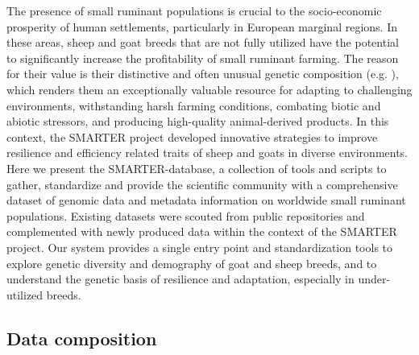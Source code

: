\documentclass[a4paper,num-refs,gigabyte]{oup-contemporary}
\begin{document}
The presence of small ruminant populations is crucial to the socio-economic prosperity of human settlements, particularly in European marginal regions. In these areas, sheep and goat breeds that are not fully utilized have the potential to significantly increase the profitability of small ruminant farming. The reason for their value is their distinctive and often unusual genetic composition (e.g. \citep{Stella2018,Kijas2012}), which renders them an exceptionally valuable resource for adapting to challenging environments, withstanding harsh farming conditions, combating biotic and abiotic stressors, and producing high-quality animal-derived products. In this context, the SMARTER project\citep{SmarterProjectEU} developed innovative strategies to improve resilience and efficiency related traits of sheep and goats in diverse environments.
Here we present the SMARTER-database, a collection of tools and scripts to gather, standardize and provide the scientific community with a comprehensive dataset of genomic data and metadata information on worldwide small ruminant populations. Existing datasets were scouted from public repositories and complemented with newly produced data within the context of the SMARTER project\citep{SmarterProjectEU}. Our system provides a single entry point and standardization tools to explore genetic diversity and demography of goat and sheep breeds, and to understand the genetic basis of resilience and adaptation, especially in under-utilized breeds.

\subsection{Data composition}
\end{document}
